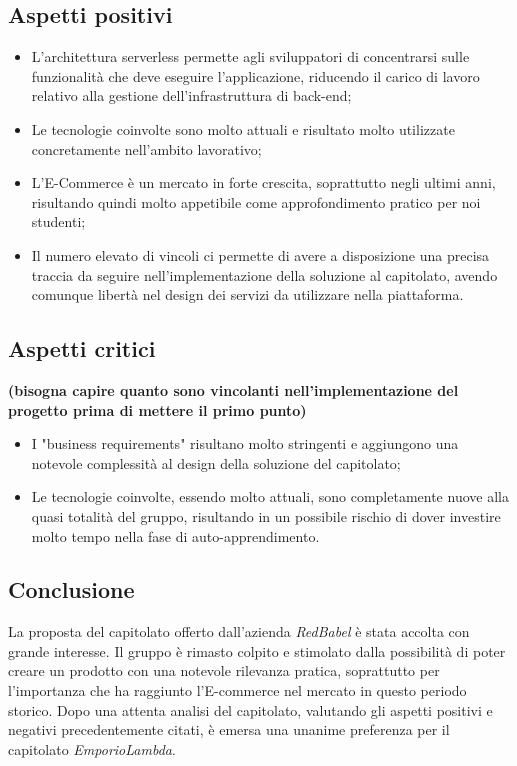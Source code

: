 \subsection{Aspetti positivi}{
\begin{itemize}
\item L'architettura serverless permette agli sviluppatori di concentrarsi sulle funzionalità che deve eseguire l'applicazione, riducendo il carico di lavoro relativo alla gestione dell'infrastruttura di back-end;
\item Le tecnologie coinvolte sono molto attuali e risultato molto utilizzate concretamente nell'ambito lavorativo;
\item L'E-Commerce è un mercato in forte crescita, soprattutto negli ultimi anni, risultando quindi molto appetibile come approfondimento pratico per noi studenti;
\item Il numero elevato di vincoli ci permette di avere a disposizione una precisa traccia da seguire nell'implementazione della soluzione al capitolato, avendo comunque libertà nel design dei servizi da utilizzare nella piattaforma.
\end{itemize}
}

\subsection{Aspetti critici}{
\textbf{(bisogna capire quanto sono vincolanti nell'implementazione del progetto prima di mettere il primo punto)}
\begin{itemize}
\item I "business requirements" risultano molto stringenti e aggiungono una notevole complessità al design della soluzione del capitolato;
\item Le tecnologie coinvolte, essendo molto attuali, sono completamente nuove alla quasi totalità del gruppo, risultando in un possibile rischio di dover investire molto tempo nella fase di auto-apprendimento.
\end{itemize}
}

\subsection{Conclusione}{
La proposta del capitolato offerto dall'azienda \textit{RedBabel} è stata accolta con grande interesse. Il gruppo è rimasto colpito e stimolato dalla possibilità di poter creare un prodotto con una notevole rilevanza pratica, soprattutto per l'importanza che ha raggiunto l'E-commerce nel mercato in questo periodo storico. Dopo una attenta analisi del capitolato, valutando gli aspetti positivi e negativi precedentemente citati, è emersa una unanime preferenza per il capitolato \textit{EmporioLambda}.
}

